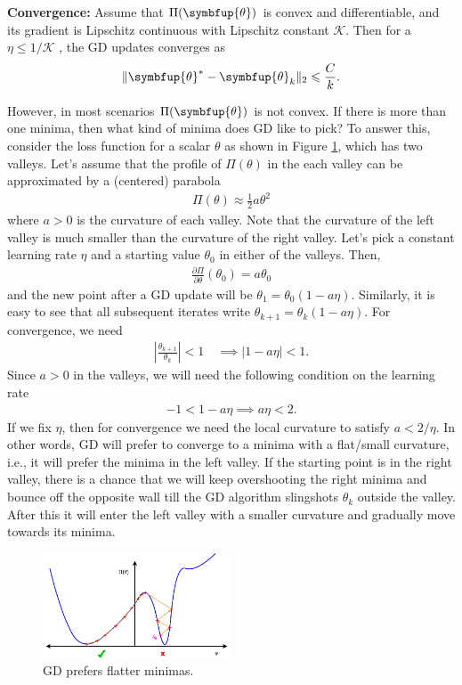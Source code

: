 \documentclass[11pt]{extarticle}
\theoremstyle{definition}
\newcommand{\btheta}{\symbfup{\theta}}
\newcommand{\df}[2]{\frac{\partial #1}{\partial #2}}
\begin{document}
\textbf{Convergence:} Assume that $\Pi(\btheta)$ is convex and differentiable, and its gradient is Lipschitz continuous with Lipschitz constant  $\mathcal{K}$. Then for a $\eta \leqslant 1/\mathcal{K}$ , the GD updates converges as
\begin{align*}
\|\btheta^* - \btheta_k\|_2 \leqslant \frac{C}{k}.
\end{align*}

However, in most scenarios $\Pi(\btheta)$ is not convex. If there is more than one minima, then what kind of minima does GD like to pick? To answer this, consider the loss function for a scalar $\theta$ as  shown in Figure \ref{fig:GD}, which has two valleys. Let's assume that the profile of $\Pi(\theta)$ in the each valley can be approximated by a (centered) parabola
\begin{align*}
\Pi(\theta) \approx \frac{1}{2} a \theta^2
\end{align*}
where $a > 0$ is the  curvature of each valley. Note that the curvature of the left valley is much smaller than the curvature of the right valley. Let's pick a constant learning rate $\eta$ and a starting value $\theta_0$ in either of the valleys. Then, 
\begin{align*}
\df{\Pi}{\theta}(\theta_0) = a \theta_0
\end{align*}
and the new point after a GD update will be $\theta_1 = \theta_0(1-a\eta)$. Similarly, it is easy to see that all subsequent iterates write $\theta_{k+1} = \theta_k(1-a\eta)$. For convergence, we need
\begin{align*}
\left| \frac{\theta_{k+1}}{\theta_k}\right| < 1 \quad \implies |1 - a \eta| < 1.
\end{align*}
Since $a>0$ in the valleys, we will need the following condition on the learning rate
\begin{align*}
-1 < 1 - a \eta \implies a\eta < 2.
\end{align*}
If we fix $\eta$, then for convergence we need the local curvature to satisfy $a < 2/\eta$. In other words, GD will prefer to converge to a minima with a flat/small curvature, i.e., it will prefer the minima in the left valley. If the starting point is in the right valley, there is a chance that we will keep overshooting the right minima and bounce off the opposite wall till the GD algorithm slingshots $\theta_k$ outside the valley. After this it will enter the left valley with a smaller curvature and gradually move towards its minima.

\begin{figure}[htbp!]
\begin{center}
\includegraphics[width=0.5\textwidth]{fig/nn/GD.pdf}
\caption{GD prefers flatter minimas.}
\label{fig:GD}
\end{center}
\end{figure}
\end{document}
